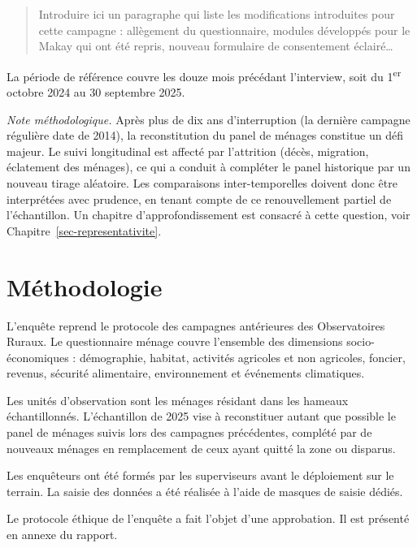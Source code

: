 \documentclass[
  french,
  letterpaper,
]{report}
\begin{document}
\begin{quote}
Introduire ici un paragraphe qui liste les modifications introduites
pour cette campagne : allègement du questionnaire, modules développés
pour le Makay qui ont été repris, nouveau formulaire de consentement
éclairé\ldots{}
\end{quote}

La période de référence couvre les douze mois précédant l'interview,
soit du 1\textsuperscript{er} octobre 2024 au 30 septembre 2025.

\emph{Note méthodologique.} Après plus de dix ans d'interruption (la
dernière campagne régulière date de 2014), la reconstitution du panel de
ménages constitue un défi majeur. Le suivi longitudinal est affecté par
l'attrition (décès, migration, éclatement des ménages), ce qui a conduit
à compléter le panel historique par un nouveau tirage aléatoire. Les
comparaisons inter-temporelles doivent donc être interprétées avec
prudence, en tenant compte de ce renouvellement partiel de
l'échantillon. Un chapitre d'approfondissement est consacré à cette
question, voir Chapitre~\ref{sec-representativite}.

\section{Méthodologie}\label{muxe9thodologie}

L'enquête reprend le protocole des campagnes antérieures des
Observatoires Ruraux. Le questionnaire ménage couvre l'ensemble des
dimensions socio-économiques : démographie, habitat, activités agricoles
et non agricoles, foncier, revenus, sécurité alimentaire, environnement
et événements climatiques.

Les unités d'observation sont les ménages résidant dans les hameaux
échantillonnés. L'échantillon de 2025 vise à reconstituer autant que
possible le panel de ménages suivis lors des campagnes précédentes,
complété par de nouveaux ménages en remplacement de ceux ayant quitté la
zone ou disparus.

Les enquêteurs ont été formés par les superviseurs avant le déploiement
sur le terrain. La saisie des données a été réalisée à l'aide de masques
de saisie dédiés.

\begin{tcolorbox}[enhanced jigsaw, colframe=quarto-callout-note-color-frame, colback=white, titlerule=0mm, colbacktitle=quarto-callout-note-color!10!white, toptitle=1mm, opacitybacktitle=0.6, title=\textcolor{quarto-callout-note-color}{\faInfo}\hspace{0.5em}{Note}, left=2mm, leftrule=.75mm, bottomtitle=1mm, coltitle=black, arc=.35mm, rightrule=.15mm, bottomrule=.15mm, toprule=.15mm, opacityback=0, breakable]

Le protocole éthique de l'enquête a fait l'objet d'une approbation. Il
est présenté en annexe du rapport.

\end{tcolorbox}
\end{document}
